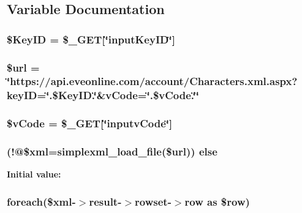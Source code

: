 \subsection{Variable Documentation}
\hypertarget{submit_8php_a1585f1347cd30da8040cc965a42421e3}{
\subsubsection[{\$\+Key\+I\+D}]{\setlength{\rightskip}{0pt plus 5cm}\$Key\+I\+D = \$\+\_\+\+G\+E\+T\mbox{[}\char`\"{}input\+Key\+I\+D\char`\"{}\mbox{]}}}\label{submit_8php_a1585f1347cd30da8040cc965a42421e3}
\hypertarget{submit_8php_acf215f34a917d014776ce684a9ee8909}{
\subsubsection[{\$url}]{\setlength{\rightskip}{0pt plus 5cm}\$url = \char`\"{}https\+://api.\+eveonline.\+com/account/Characters.\+xml.\+aspx?key\+I\+D=\char`\"{}.\$Key\+I\+D.\char`\"{}\&v\+Code=\char`\"{}.\$v\+Code.\char`\"{}\char`\"{}}}\label{submit_8php_acf215f34a917d014776ce684a9ee8909}
\hypertarget{submit_8php_a55dd43886b9084aeee05444024079444}{
\subsubsection[{\$v\+Code}]{\setlength{\rightskip}{0pt plus 5cm}\$v\+Code = \$\+\_\+\+G\+E\+T\mbox{[}\char`\"{}inputv\+Code\char`\"{}\mbox{]}}}\label{submit_8php_a55dd43886b9084aeee05444024079444}
\hypertarget{submit_8php_ac88ce4490803385e170e756011ae87f5}{
\subsubsection[{else}]{ (!@\$xml=simplexml\+\_\+load\+\_\+file(\$url)) else}}\label{submit_8php_ac88ce4490803385e170e756011ae87f5}
{\bfseries Initial value\+:}
\hypertarget{submit_8php_ac504d4a137641e880f0b9693d36d2e16}{
\subsubsection[{foreach}]{\setlength{\rightskip}{0pt plus 5cm}foreach(\$xml-\/$>$result-\/$>$rowset-\/$>$row as \$row)}}\label{submit_8php_ac504d4a137641e880f0b9693d36d2e16}
